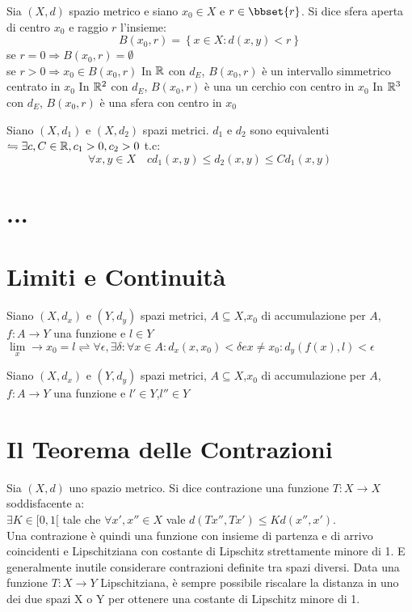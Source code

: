 Sia $(X,d)$ spazio metrico e siano $x_0\in X$ e $r\in\bbset{r}$. Si dice sfera aperta di centro $x_0$ e raggio $r$ l'insieme:
$$B(x_0,r)=\left\{ x\in X : d(x,y)<r  \right\}$$
\observation
se $r=0\Rightarrow B(x_0,r)=\emptyset$\\
se $r>0\Rightarrow x_0\in B(x_0,r)$
\example
In $\mathbb{R}$ con $d_E$, $B(x_0,r)$ è un intervallo simmetrico centrato in $x_0$
\example
In $\mathbb{R}^{2}$ con $d_E$, $B(x_0,r)$ è una un cerchio con centro in $x_0$
\example
In $\mathbb{R}^{3}$ con $d_E$, $B(x_0,r)$ è una sfera con centro in $x_0$
\example
\example

Siano $(X,d_1)$ e $(X,d_2)$ spazi metrici. $d_1$ e $d_2$ sono equivalenti $\leftrightharpoons \exists c,C\in\mathbb{R}, c_1>0, c_2>0$ t.c:
$$ \forall x,y \in X\quad cd_1(x,y)\le d_2(x,y)\le Cd_1(x,y) $$


\section{...}
\section{Limiti e Continuità}
Siano $(X,d_x)$ e $(Y,d_y)$ spazi metrici, $A\subseteq{X}$,$x_0$ di accumulazione per $A$, $f:A\rightarrow{Y}$ una funzione e $l\in{Y}$ \\
$\lim\limits_x\rightarrow{x_0} = l \rightleftharpoons \forall{\epsilon},\exists\delta : \forall{x}\in A : d_x(x,x_0)<\delta e x\ne{x_0} : d_y(f(x),l)<\epsilon$

\proposition
Siano $(X,d_x)$ e $(Y,d_y)$ spazi metrici, $A\subseteq{X}$,$x_0$ di accumulazione per $A$, $f:A\rightarrow{Y}$ una funzione e $l'\in{Y}$,$l''\in{Y}$  \\

\section{Il Teorema delle Contrazioni}
Sia $(X, d)$ uno spazio metrico. Si dice contrazione una funzione
$T: X \rightarrow X$ soddisfacente a:\\

$\exists K \in [0, 1[ $ tale che $\forall x',x''\in X$ vale
$d(Tx'', T x')\le Kd(x'', x').$\\


Una contrazione è quindi una funzione con insieme di partenza e di arrivo coincidenti e
Lipschitziana con costante di Lipschitz strettamente minore di 1.
E generalmente inutile considerare contrazioni definite tra spazi diversi. Data una funzione
$T: X\rightarrow Y$ Lipschitziana, è sempre possibile riscalare la distanza in uno dei due spazi X o Y
per ottenere una costante di Lipschitz minore di 1.

